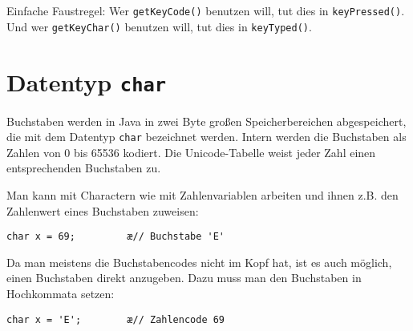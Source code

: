 Einfache Faustregel: Wer \lstinline|getKeyCode()| benutzen will, tut dies in
\lstinline|keyPressed()|. Und wer \lstinline|getKeyChar()| benutzen will, tut
dies in \lstinline|keyTyped()|.


\section{Datentyp \lstinline|char|}

Buchstaben werden in Java in zwei Byte großen Speicherbereichen abgespeichert,
die mit dem Datentyp \lstinline|char| bezeichnet werden. Intern werden die
Buchstaben als Zahlen von 0 bis 65536 kodiert. Die Unicode-Tabelle weist jeder
Zahl einen entsprechenden Buchstaben zu.

Man kann mit Charactern wie mit Zahlenvariablen arbeiten und ihnen z.B. den
Zahlenwert eines Buchstaben zuweisen:

\begin{lstlisting}
char x = 69;         æ// Buchstabe 'E'
\end{lstlisting}

Da man meistens die Buchstabencodes nicht im Kopf hat, ist es auch möglich,
einen Buchstaben direkt anzugeben. Dazu muss man den Buchstaben in Hochkommata
setzen:

\begin{lstlisting}
char x = 'E';        æ// Zahlencode 69
\end{lstlisting}
